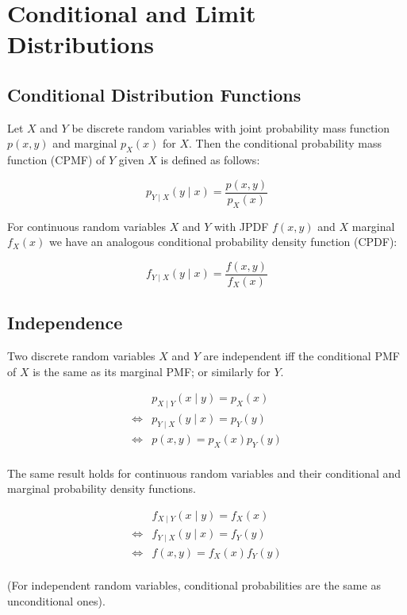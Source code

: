 \section{Conditional and Limit Distributions}

\subsection*{Conditional Distribution Functions}

Let $X$ and $Y$ be discrete random variables with joint probability mass function $p(x,y)$ and marginal $p_X(x)$ for $X$. Then the conditional probability mass function (CPMF) of $Y$ given $X$ is defined as follows:

$$ p_{Y\mid X}(y\mid x) = \frac{p(x,y)}{p_X(x)} $$

For continuous random variables $X$ and $Y$ with JPDF $f(x,y)$ and $X$ marginal $f_X(x)$ we have an analogous conditional probability density function (CPDF):

$$ f_{Y\mid X}(y\mid x) = \frac{f(x,y)}{f_X(x)} $$

\subsection*{Independence}

Two discrete random variables $X$ and $Y$ are independent iff the conditional PMF of $X$ is the same as its marginal PMF; or similarly for $Y$.

\begin{align*}
         & p_{X\mid Y}(x\mid y) = p_X(x) \\
    \iff & p_{Y\mid X}(y\mid x) = p_Y(y) \\
    \iff & p(x,y) = p_X(x)p_Y(y)         \\
\end{align*}

The same result holds for continuous random variables and their conditional and marginal probability density functions.

\begin{align*}
         & f_{X\mid Y}(x\mid y) = f_X(x) \\
    \iff & f_{Y\mid X}(y\mid x) = f_Y(y) \\
    \iff & f(x,y) = f_X(x)f_Y(y)         \\
\end{align*}

(For independent random variables, conditional probabilities are the same as unconditional ones).

